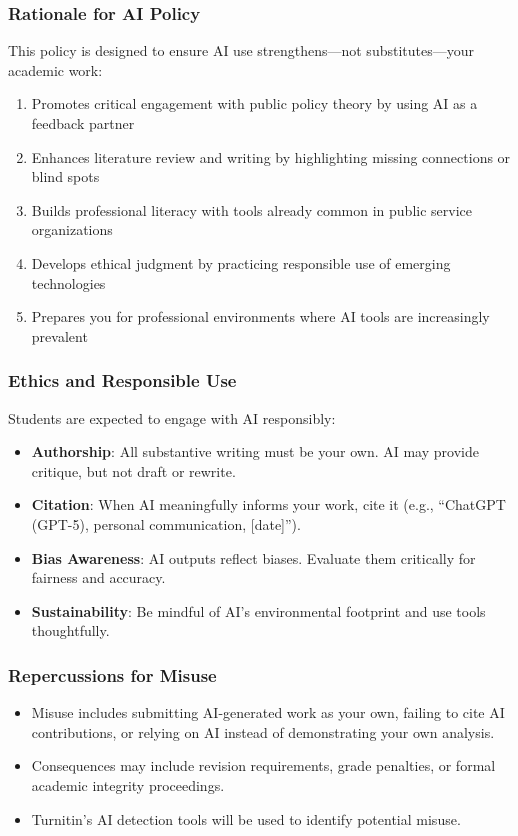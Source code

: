 \documentclass[12pt]{article}     %
\begin{document}
\subsubsection*{Rationale for AI Policy}

This policy is designed to ensure AI use strengthens---not substitutes---your academic work:

\begin{enumerate}
    \item Promotes critical engagement with public policy theory by using AI as a feedback partner
    \item Enhances literature review and writing by highlighting missing connections or blind spots
    \item Builds professional literacy with tools already common in public service organizations
    \item Develops ethical judgment by practicing responsible use of emerging technologies
    \item Prepares you for professional environments where AI tools are increasingly prevalent
\end{enumerate}

\subsubsection*{Ethics and Responsible Use}

\noindent Students are expected to engage with AI responsibly:

\begin{itemize}
    \item \textbf{Authorship}: All substantive writing must be your own. AI may provide critique, but not draft or rewrite.
    \item \textbf{Citation}: When AI meaningfully informs your work, cite it (e.g., ``ChatGPT (GPT-5), personal communication, [date]'').
    \item \textbf{Bias Awareness}: AI outputs reflect biases. Evaluate them critically for fairness and accuracy.
    \item \textbf{Sustainability}: Be mindful of AI's environmental footprint and use tools thoughtfully.
\end{itemize}

\subsubsection*{Repercussions for Misuse}

\begin{itemize}
    \item Misuse includes submitting AI-generated work as your own, failing to cite AI contributions, or relying on AI instead of demonstrating your own analysis.
    \item Consequences may include revision requirements, grade penalties, or formal academic integrity proceedings.
    \item Turnitin's AI detection tools will be used to identify potential misuse.
\end{itemize}
\end{document}
